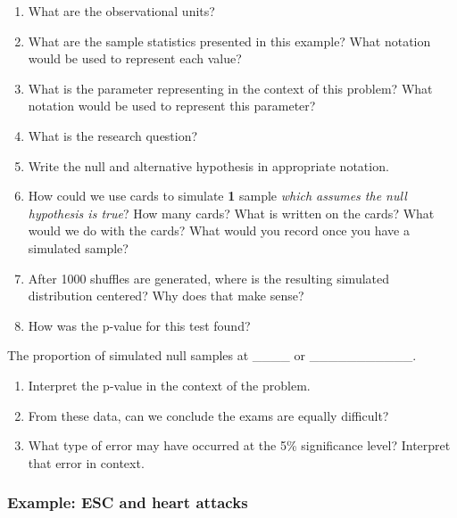 \documentclass[
]{report}
\newcommand{\rgs}{\vspace{12pt}} %
\begin{document}
\begin{enumerate}
\def\labelenumi{\arabic{enumi}.}
\item
  What are the observational units?
  \rgs
\item
  What are the sample statistics presented in this example? What notation would be used to represent each value?
  \rgs
\item
  What is the parameter representing in the context of this problem? What notation would be used to represent this parameter?
  \rgs
  \rgs
\item
  What is the research question?
  \rgs
\item
  Write the null and alternative hypothesis in appropriate notation.
  \rgs
\item
  How could we use cards to simulate \textbf{1} sample \emph{which assumes the null hypothesis is true}? How many cards? What is written on the cards? What would we do with the cards? What would you record once you have a simulated sample?
  \rgs
  \rgs
\item
  After 1000 shuffles are generated, where is the resulting simulated distribution centered? Why does that make sense?
  \rgs
  \rgs
\item
  How was the p-value for this test found?
\end{enumerate}

The proportion of simulated null samples at \_\_\_\_ or \_\_\_\_\_\_\_\_\_\_\_.
\rgs

\begin{enumerate}
\def\labelenumi{\arabic{enumi}.}
\setcounter{enumi}{8}
\item
  Interpret the p-value in the context of the problem.
  \rgs
  \rgs
\item
  From these data, can we conclude the exams are equally difficult?
  \rgs
\item
  What type of error may have occurred at the 5\% significance level? Interpret that error in context.
  \rgs
  \rgs
\end{enumerate}

\hypertarget{example-esc-and-heart-attacks}{%
\subsubsection*{Example: ESC and heart attacks}\label{example-esc-and-heart-attacks}}
\end{document}
